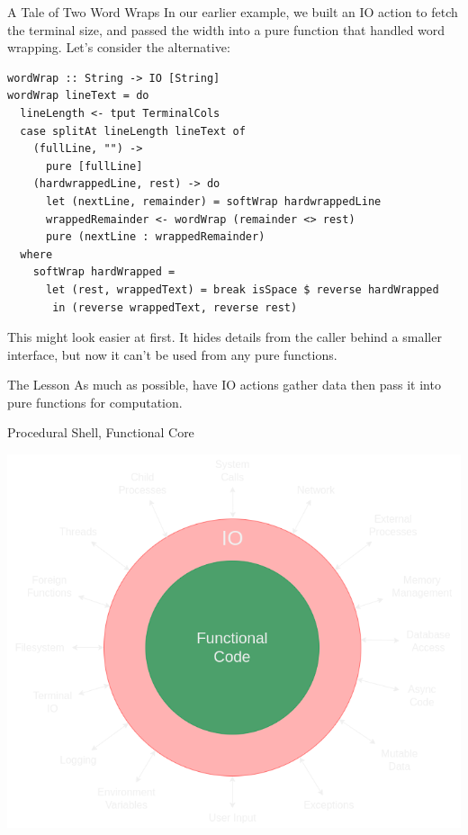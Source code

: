 \documentclass[10pt, presentation, colorlinks]{beamer}
\begin{document}
\begin{frame}[label={sec:org69fa52c},fragile]{A Tale of Two Word Wraps}
 In our earlier example, we built an IO action to fetch the terminal size, and passed the width into a \alert{pure function} that handled word wrapping. Let's consider the alternative:

\pause

\begin{verbatim}
wordWrap :: String -> IO [String]
wordWrap lineText = do
  lineLength <- tput TerminalCols
  case splitAt lineLength lineText of
    (fullLine, "") ->
      pure [fullLine]
    (hardwrappedLine, rest) -> do
      let (nextLine, remainder) = softWrap hardwrappedLine
      wrappedRemainder <- wordWrap (remainder <> rest)
      pure (nextLine : wrappedRemainder)
  where
    softWrap hardWrapped =
      let (rest, wrappedText) = break isSpace $ reverse hardWrapped
       in (reverse wrappedText, reverse rest)
\end{verbatim}

\pause
This might look \alert{easier} at first. It hides details from the caller
behind a smaller interface, but now it can't be used from any pure
functions.
\end{frame}

\begin{frame}[label={sec:orgceb9b28}]{The Lesson}
As much as possible, have IO actions gather data then pass it into
pure functions for computation.
\end{frame}

\begin{frame}[label={sec:org8cade50}]{Procedural Shell, Functional Core}
\begin{center}
\includegraphics[height=0.6\textheight]{./img/functional-core.png}
\end{center}
\end{frame}
\end{document}
